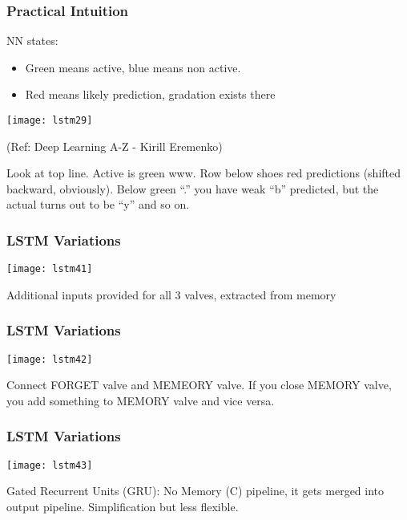 \begin{frame}[fragile] \frametitle{Practical Intuition}
NN states:
\begin{itemize}
\item Green means active, blue means non active.
\item Red means  likely prediction, gradation exists there
\end{itemize}

\begin{center}
\texttt{[image: lstm29]}

\tiny{(Ref: Deep Learning A-Z - Kirill Eremenko)}
\end{center}

Look at top line. Active is green www. Row below shoes red predictions (shifted backward, obviously). Below green ``.'' you have weak ``b'' predicted, but the actual turns out to be ``y'' and so on.
\end{frame}

\begin{frame}[fragile] \frametitle{LSTM Variations}
\begin{center}
\texttt{[image: lstm41]}
\end{center}
Additional inputs provided for all 3 valves, extracted from memory
\end{frame}

\begin{frame}[fragile] \frametitle{LSTM Variations}
\begin{center}
\texttt{[image: lstm42]}
\end{center}
Connect FORGET valve and MEMEORY valve. If you close MEMORY valve, you add something to MEMORY valve and vice versa.
\end{frame}

\begin{frame}[fragile] \frametitle{LSTM Variations}
\begin{center}
\texttt{[image: lstm43]}
\end{center}
Gated Recurrent Units (GRU): No Memory (C) pipeline, it gets merged into output pipeline. Simplification but less flexible.
\end{frame}

